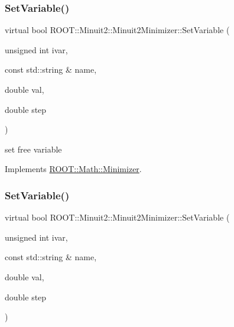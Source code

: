 \subsubsection{\texorpdfstring{SetVariable()}{SetVariable()}\hspace{0.1cm}{\footnotesize\ttfamily [1/3]}}
{\footnotesize\ttfamily virtual bool R\+O\+O\+T\+::\+Minuit2\+::\+Minuit2\+Minimizer\+::\+Set\+Variable (\begin{DoxyParamCaption}\item[{unsigned int}]{ivar,  }\item[{const std\+::string \&}]{name,  }\item[{double}]{val,  }\item[{double}]{step }\end{DoxyParamCaption})\hspace{0.3cm}{\ttfamily [virtual]}}



set free variable 



Implements \mbox{\hyperlink{classROOT_1_1Math_1_1Minimizer_a8661a2ac86372602f32f97b3d9262421}{R\+O\+O\+T\+::\+Math\+::\+Minimizer}}.

\mbox{\label{classROOT_1_1Minuit2_1_1Minuit2Minimizer_a951ad856f74ded3c64836fa28fdf9bb5}} 
\subsubsection{\texorpdfstring{SetVariable()}{SetVariable()}\hspace{0.1cm}{\footnotesize\ttfamily [2/3]}}
{\footnotesize\ttfamily virtual bool R\+O\+O\+T\+::\+Minuit2\+::\+Minuit2\+Minimizer\+::\+Set\+Variable (\begin{DoxyParamCaption}\item[{unsigned int}]{ivar,  }\item[{const std\+::string \&}]{name,  }\item[{double}]{val,  }\item[{double}]{step }\end{DoxyParamCaption})\hspace{0.3cm}{\ttfamily [virtual]}}



